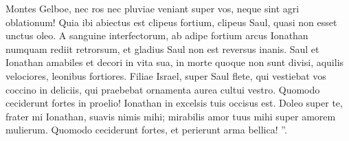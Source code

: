 \begin{biblechapter}
 \verse Montes Gelboe, nec ros nec pluviae veniant super vos,
 neque sint agri oblationum!
 Quia ibi abiectus est clipeus fortium,
 clipeus Saul, quasi non esset unctus oleo.
 \verse A sanguine interfectorum, ab adipe fortium
 arcus Ionathan numquam rediit retrorsum,
 et gladius Saul non est reversus inanis.
 \verse Saul et Ionathan amabiles et decori in vita sua,
 in morte quoque non sunt divisi,
 aquilis velociores, leonibus fortiores. 
\verse Filiae Israel, super Saul flete,
 qui vestiebat vos coccino in deliciis, qui praebebat ornamenta aurea cultui vestro.
 \verse Quomodo ceciderunt fortes in proelio!
 Ionathan in excelsis tuis occisus est. 
\verse Doleo super te, frater mi Ionathan,
 suavis nimis mihi;
 mirabilis amor tuus mihi
 super amorem mulierum.
 \verse Quomodo ceciderunt fortes,
 et perierunt arma bellica! ”.
 

\end{biblechapter}

